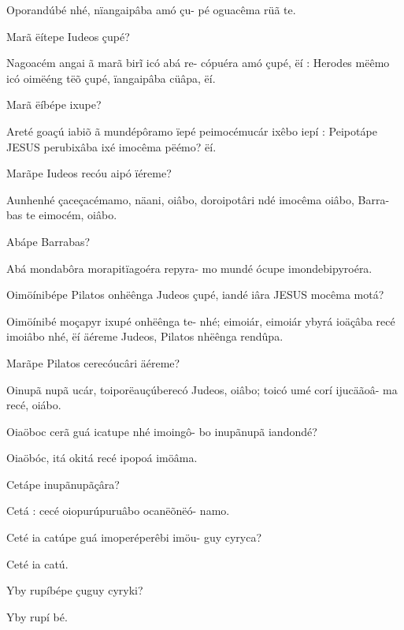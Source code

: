\documentclass[openany,titlepage,12pt]{book}
\begin{document}
\begin{altereven}
    \item Oporandúbé nhé, nïangaipâba amó çu-
        pé oguacêma rüã te.
    \item Marã ëítepe Iudeos çupé?
    \item Nagoacém angai ã marã bir\~i icó abá re-
        cópuéra amó çupé, ëí : Herodes mëêmo
        icó oimëéng tëõ çupé, ïangaipâba cüâpa,
        ëí.
    \item Marã ëíbépe ixupe?
    \item Areté goaçú iabiõ ã mundépôramo ïepé
        peimocémucár ixêbo iepí : Peipotápe\linebreak
        JESUS perubixâba ixé imocêma pëémo?
        ëí.
    \item Marãpe Iudeos recóu aipó ïéreme?
    \item Aunhenhé çaceçacémamo, näani, oiâbo,
        doroipotâri ndé imocêma oiâbo, Barra-\linebreak
        bas te eimocém, oiâbo.
    \item Abápe Barrabas?
    \item Abá mondabôra morapitïagoéra repyra-
        mo mundé ócupe imondebipyroéra.
    \item Oimöínibépe Pilatos onhëênga Judeos
        çupé, iandé iâra JESUS mocêma motá?
    \item Oimöínibé moçapyr ixupé onhëênga te-
        nhé; eimoiár, eimoiár ybyrá ioäçâba recé
        imoiâbo nhé, ëí äéreme Judeos, Pilatos\linebreak
        nhëênga rendûpa.
    \item Marãpe Pilatos cerecóucâri äéreme?
    \item Oinupã nupã ucár, toiporëauçúberecó
        Judeos, oiâbo; toicó umé corí ijucäãoâ-\linebreak
        ma recé, oiábo.
    \item Oiaöboc cerã guá icatupe nhé imoingô-
        bo inupãnupã iandondé?
    \item Oiaöbóc, itá okitá recé ipopoá imöâma.
    \item Cetápe inupãnupãçâra?
    \item Cetá : cecé oiopurúpuruâbo ocanëõnëó-
        namo.
    \item Ceté ia catúpe guá imoperéperêbi imöu-
        guy cyryca?
    \item Ceté ia catú.
    \item Yby rupíbépe çuguy cyryki?
    \item Yby rupí bé.\pagebreak
\end{altereven}
\end{document}
